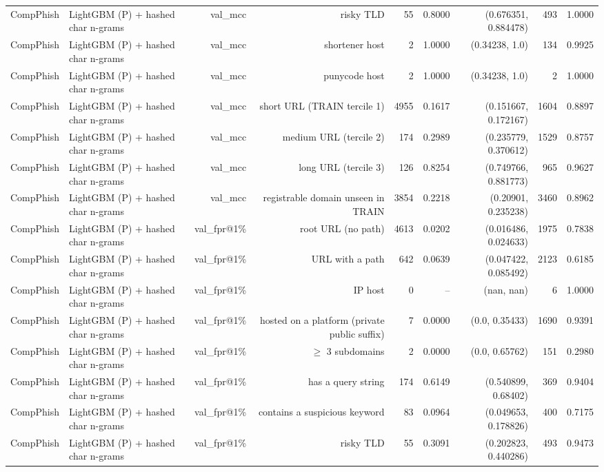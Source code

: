 \begin{table}[t]
\begin{tabular}{llrrrrrrr}
CompPhish & LightGBM (P) + hashed char n-grams & val\_mcc & risky TLD & 55 & 0.8000 & (0.676351, 0.884478) & 493 & 1.0000 \\
CompPhish & LightGBM (P) + hashed char n-grams & val\_mcc & shortener host & 2 & 1.0000 & (0.34238, 1.0) & 134 & 0.9925 \\
CompPhish & LightGBM (P) + hashed char n-grams & val\_mcc & punycode host & 2 & 1.0000 & (0.34238, 1.0) & 2 & 1.0000 \\
CompPhish & LightGBM (P) + hashed char n-grams & val\_mcc & short URL (TRAIN tercile 1) & 4955 & 0.1617 & (0.151667, 0.172167) & 1604 & 0.8897 \\
CompPhish & LightGBM (P) + hashed char n-grams & val\_mcc & medium URL (tercile 2) & 174 & 0.2989 & (0.235779, 0.370612) & 1529 & 0.8757 \\
CompPhish & LightGBM (P) + hashed char n-grams & val\_mcc & long URL (tercile 3) & 126 & 0.8254 & (0.749766, 0.881773) & 965 & 0.9627 \\
CompPhish & LightGBM (P) + hashed char n-grams & val\_mcc & registrable domain unseen in TRAIN & 3854 & 0.2218 & (0.20901, 0.235238) & 3460 & 0.8962 \\
CompPhish & LightGBM (P) + hashed char n-grams & val\_fpr@1\% & root URL (no path) & 4613 & 0.0202 & (0.016486, 0.024633) & 1975 & 0.7838 \\
CompPhish & LightGBM (P) + hashed char n-grams & val\_fpr@1\% & URL with a path & 642 & 0.0639 & (0.047422, 0.085492) & 2123 & 0.6185 \\
CompPhish & LightGBM (P) + hashed char n-grams & val\_fpr@1\% & IP host & 0 & -- & (nan, nan) & 6 & 1.0000 \\
CompPhish & LightGBM (P) + hashed char n-grams & val\_fpr@1\% & hosted on a platform (private public suffix) & 7 & 0.0000 & (0.0, 0.35433) & 1690 & 0.9391 \\
CompPhish & LightGBM (P) + hashed char n-grams & val\_fpr@1\% & $\geq$ 3 subdomains & 2 & 0.0000 & (0.0, 0.65762) & 151 & 0.2980 \\
CompPhish & LightGBM (P) + hashed char n-grams & val\_fpr@1\% & has a query string & 174 & 0.6149 & (0.540899, 0.68402) & 369 & 0.9404 \\
CompPhish & LightGBM (P) + hashed char n-grams & val\_fpr@1\% & contains a suspicious keyword & 83 & 0.0964 & (0.049653, 0.178826) & 400 & 0.7175 \\
CompPhish & LightGBM (P) + hashed char n-grams & val\_fpr@1\% & risky TLD & 55 & 0.3091 & (0.202823, 0.440286) & 493 & 0.9473 \\

\end{tabular}
\end{table}
